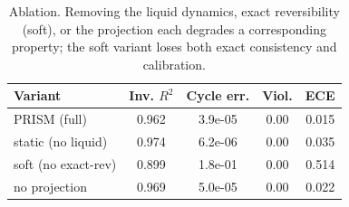 \begin{table}[t]
\centering
\caption{Ablation. Removing the liquid dynamics, exact reversibility (soft), or the projection each degrades a corresponding property; the soft variant loses both exact consistency and calibration.}
\label{tab:ablation}
\begin{tabular}{lcccc}
\toprule
Variant & Inv. $R^2$ & Cycle err. & Viol. & ECE \\
\midrule
PRISM (full) & 0.962 & 3.9e-05 & 0.00 & 0.015 \\
static (no liquid) & 0.974 & 6.2e-06 & 0.00 & 0.035 \\
soft (no exact-rev) & 0.899 & 1.8e-01 & 0.00 & 0.514 \\
no projection & 0.969 & 5.0e-05 & 0.00 & 0.022 \\
\bottomrule
\end{tabular}
\end{table}
